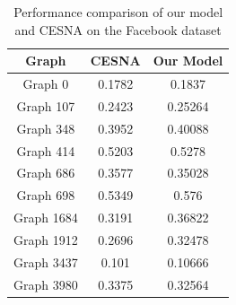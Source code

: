 \documentclass[11pt]{article}
\begin{document}
\begin{table}[H]
\begin{center}
\begin{tabular}{|c|c|c|}
\hline
\textbf{Graph} & \textbf{CESNA} & \textbf{Our Model} \\ \hline
Graph 0 & 0.1782 & 0.1837 \\ \hline
Graph 107 & 0.2423 & 0.25264 \\ \hline
Graph 348 & 0.3952 & 0.40088 \\ \hline
Graph 414 & 0.5203 & 0.5278 \\ \hline
Graph 686 & 0.3577 & 0.35028 \\ \hline
Graph 698 & 0.5349 & 0.576 \\ \hline
Graph 1684 & 0.3191 & 0.36822 \\ \hline
Graph 1912 & 0.2696 & 0.32478 \\ \hline
Graph 3437 & 0.101 & 0.10666 \\ \hline
Graph 3980 & 0.3375 & 0.32564 \\ \hline
\end{tabular}
\end{center}
\caption{Performance comparison of our model and CESNA on the Facebook dataset}
\end{table}
\end{document}
